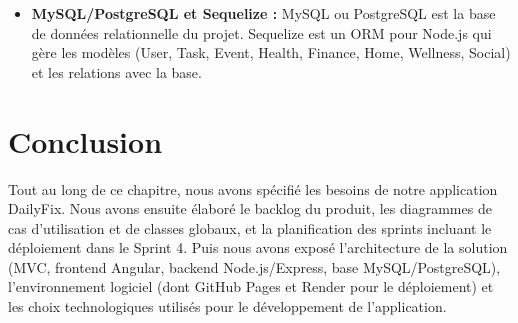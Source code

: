 \begin{itemize}
\item \textbf{MySQL/PostgreSQL et Sequelize :} MySQL ou PostgreSQL est la base de données relationnelle du projet. Sequelize est un ORM pour Node.js qui gère les modèles (User, Task, Event, Health, Finance, Home, Wellness, Social) et les relations avec la base.
\end{itemize}

\section{Conclusion}
Tout au long de ce chapitre, nous avons spécifié les besoins de notre application DailyFix. Nous avons ensuite élaboré le backlog du produit, les diagrammes de cas d'utilisation et de classes globaux, et la planification des sprints incluant le déploiement dans le Sprint 4. Puis nous avons exposé l'architecture de la solution (MVC, frontend Angular, backend Node.js/Express, base MySQL/PostgreSQL), l'environnement logiciel (dont GitHub Pages et Render pour le déploiement) et les choix technologiques utilisés pour le développement de l'application.
